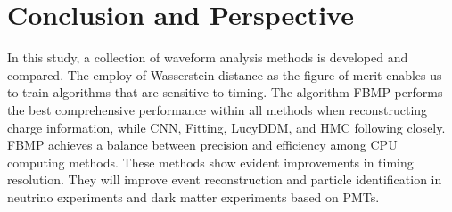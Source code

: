 \section{Conclusion and Perspective} %
\label{sec:conclusion}

In this study, a collection of waveform analysis methods is developed and compared. The employ of Wasserstein distance as the figure of merit enables us to train algorithms that are sensitive to timing. The algorithm FBMP performs the best comprehensive performance within all methods when reconstructing charge information, while CNN, Fitting, LucyDDM, and HMC following closely. FBMP achieves a balance between precision and efficiency among CPU computing methods. These methods show evident improvements in timing resolution. They will improve event reconstruction and particle identification in neutrino experiments and dark matter experiments based on PMTs. 

